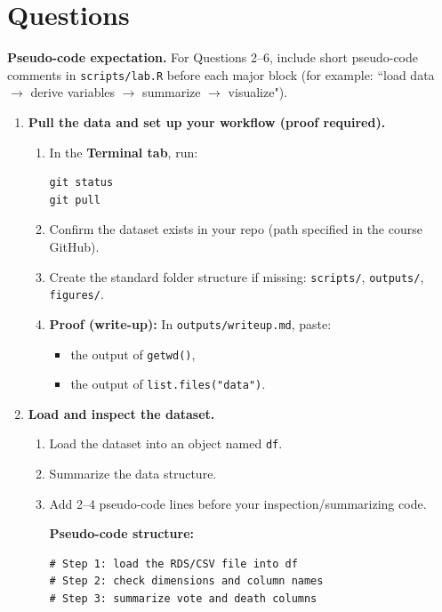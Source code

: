 \documentclass[11pt]{article}
\begin{document}
\section*{Questions}

\noindent \textbf{Pseudo-code expectation.} For Questions 2--6, include short pseudo-code comments in \texttt{scripts/lab.R} before each major block (for example: ``load data $\rightarrow$ derive variables $\rightarrow$ summarize $\rightarrow$ visualize").

\begin{enumerate}

  \item \textbf{Pull the data and set up your workflow (proof required).}
  \begin{enumerate}
    \item In the \textbf{Terminal tab}, run:
\begin{verbatim}
git status
git pull
\end{verbatim}
    \item Confirm the dataset exists in your repo (path specified in the course GitHub).
    \item Create the standard folder structure if missing: \texttt{scripts/}, \texttt{outputs/}, \texttt{figures/}.
    \item \textbf{Proof (write-up):} In \texttt{outputs/writeup.md}, paste:
    \begin{itemize}
      \item the output of \texttt{getwd()},
      \item the output of \texttt{list.files("data")}.
    \end{itemize}
  \end{enumerate}

  \item \textbf{Load and inspect the dataset.}
  \begin{enumerate}
    \item Load the dataset into an object named \texttt{df}.
    \item Summarize the data structure.
    \item Add 2--4 pseudo-code lines before your inspection/summarizing code.

    \textbf{Pseudo-code structure:}
\begin{verbatim}
# Step 1: load the RDS/CSV file into df
# Step 2: check dimensions and column names
# Step 3: summarize vote and death columns
\end{verbatim}


\end{enumerate}
\end{enumerate}
\end{document}
